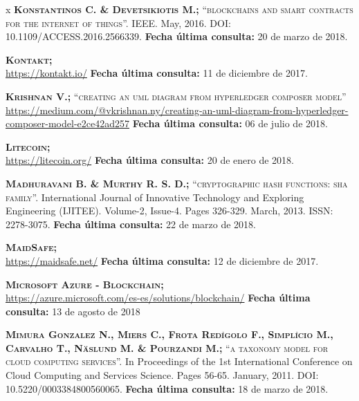 \begin{thebibliography} {x}
	 \textsc{\textbf{Konstantinos C. \& Devetsikiotis M.; }}\textsc{“blockchains and smart contracts for the internet of things”.} IEEE. May, 2016. DOI: 10.1109/ACCESS.2016.2566339.
	\newline \textbf{Fecha última consulta:} 20 de marzo de 2018.
	
	 \textsc{\textbf{Kontakt; }} \\
	\url{https://kontakt.io/}
	\newline \textbf{Fecha última consulta:} 11 de diciembre de 2017.
	
	 \textsc{\textbf{Krishnan V.; }}\textsc{“creating an uml diagram from hyperledger composer model”} \\
	\url{https://medium.com/@vkrishnan.ny/creating-an-uml-diagram-from-hyperledger-composer-model-e2ce42ad257}
	\newline \textbf{Fecha última consulta:} 06 de julio de 2018.
		
	 \textsc{\textbf{Litecoin; }} \\
	\url{https://litecoin.org/}
	\newline \textbf{Fecha última consulta:} 20 de enero de 2018.
		
	 \textsc{\textbf{Madhuravani B. \& Murthy R. S. D.; }}\textsc{“cryptographic hash functions: sha family”.} International Journal of Innovative Technology and Exploring Engineering (IJITEE). Volume-2, Issue-4. Pages 326-329. March, 2013. ISSN: 2278-3075.
	\newline \textbf{Fecha última consulta:} 22 de marzo de 2018.
	
	 \textsc{\textbf{MaidSafe; }} \\
	\url{https://maidsafe.net/}
	\newline \textbf{Fecha última consulta:} 12 de diciembre de 2017.
	
	 \textsc{\textbf{Microsoft Azure - Blockchain; }} \\ 
	\url{https://azure.microsoft.com/es-es/solutions/blockchain/} 
	\newline \textbf{Fecha última consulta:} 13 de agosto de 2018
		
	 \textsc{\textbf{Mimura Gonzalez N., Miers C., Frota Redígolo F., Simplício M., Carvalho T., Näslund M. \& Pourzandi M.; }}\textsc{“a taxonomy model for cloud computing services”.} In Proceedings of the 1st International Conference on Cloud Computing and Services Science. Pages 56-65. January, 2011. DOI: 10.5220/0003384800560065.
	\newline \textbf{Fecha última consulta:} 18 de marzo de 2018.
		

\end{thebibliography}
